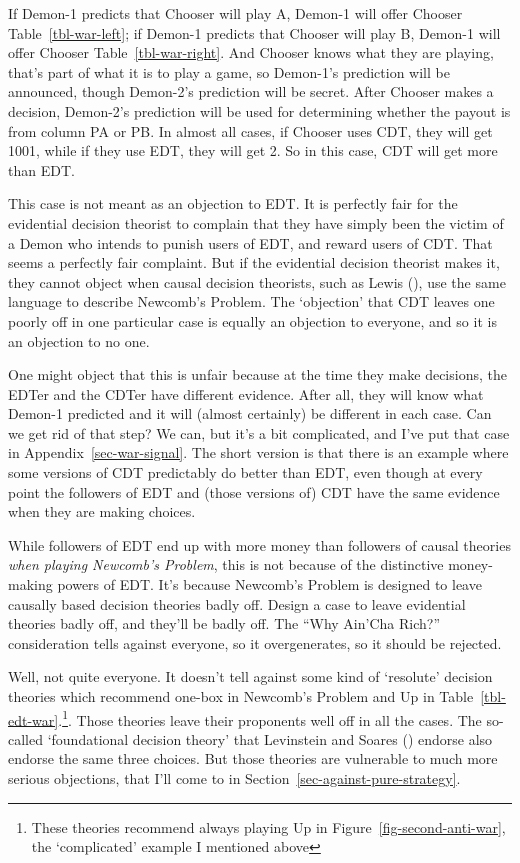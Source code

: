 \documentclass[
  12pt,
  letterpaper,
  DIV=11,
  numbers=noendperiod]{scrreprt}
\begin{document}
If Demon-1 predicts that Chooser will play A, Demon-1 will offer Chooser
Table~\ref{tbl-war-left}; if Demon-1 predicts that Chooser will play B,
Demon-1 will offer Chooser Table~\ref{tbl-war-right}. And Chooser knows
what they are playing, that's part of what it is to play a game, so
Demon-1's prediction will be announced, though Demon-2's prediction will
be secret. After Chooser makes a decision, Demon-2's prediction will be
used for determining whether the payout is from column PA or PB. In
almost all cases, if Chooser uses CDT, they will get 1001, while if they
use EDT, they will get 2. So in this case, CDT will get more than EDT.

This case is not meant as an objection to EDT. It is perfectly fair for
the evidential decision theorist to complain that they have simply been
the victim of a Demon who intends to punish users of EDT, and reward
users of CDT. That seems a perfectly fair complaint. But if the
evidential decision theorist makes it, they cannot object when causal
decision theorists, such as Lewis (), use
the same language to describe Newcomb's Problem. The `objection' that
CDT leaves one poorly off in one particular case is equally an objection
to everyone, and so it is an objection to no one.

One might object that this is unfair because at the time they make
decisions, the EDTer and the CDTer have different evidence. After all,
they will know what Demon-1 predicted and it will (almost certainly) be
different in each case. Can we get rid of that step? We can, but it's a
bit complicated, and I've put that case in
Appendix~\ref{sec-war-signal}. The short version is that there is an
example where some versions of CDT predictably do better than EDT, even
though at every point the followers of EDT and (those versions of) CDT
have the same evidence when they are making choices.

While followers of EDT end up with more money than followers of causal
theories \emph{when playing Newcomb's Problem}, this is not because of
the distinctive money-making powers of EDT. It's because Newcomb's
Problem is designed to leave causally based decision theories badly off.
Design a case to leave evidential theories badly off, and they'll be
badly off. The ``Why Ain'Cha Rich?'' consideration tells against
everyone, so it overgenerates, so it should be rejected.

Well, not quite everyone. It doesn't tell against some kind of
`resolute' decision theories which recommend one-box in Newcomb's
Problem and Up in Table~\ref{tbl-edt-war}.\footnote{These theories
  recommend always playing Up in Figure~\ref{fig-second-anti-war}, the
  `complicated' example I mentioned above}. Those theories leave their
proponents well off in all the cases. The so-called `foundational
decision theory' that Levinstein and Soares
() endorse also endorse the
same three choices. But those theories are vulnerable to much more
serious objections, that I'll come to in
Section~\ref{sec-against-pure-strategy}.
\end{document}
